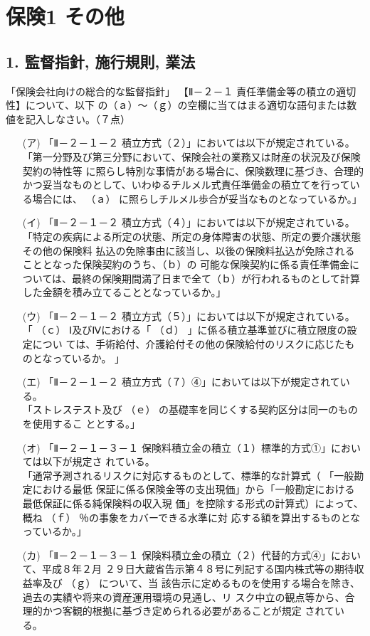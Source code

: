 \documentclass[report,gutter=10mm,fore-edge=10mm,uplatex,dvipdfmx]{jlreq}
\begin{document}
\chapter{保険1 その他}
\section{1. 監督指針, 施行規則, 業法}


「保険会社向けの総合的な監督指針」
【Ⅱ－２－１ 責任準備金等の積立の適切性】について、以下
の（ａ）～（ｇ）の空欄に当てはまる適切な語句または数値を記入しなさい。（７点）

\begin{itemize}
 \item [(ア)]「Ⅱ－２－１－２ 積立方式（２）」においては以下が規定されている。\\
「第一分野及び第三分野において、保険会社の業務又は財産の状況及び保険契約の特性等
に照らし特別な事情がある場合に、保険数理に基づき、合理的かつ妥当なものとして、いわゆるチルメル式責任準備金の積立てを行っている場合には、 （ａ） に照らしチルメル歩合が妥当なものとなっているか。」
 \item [(イ)]「Ⅱ－２－１－２ 積立方式（４）」においては以下が規定されている。\\
「特定の疾病による所定の状態、所定の身体障害の状態、所定の要介護状態その他の保険料
払込の免除事由に該当し、以後の保険料払込が免除されることとなった保険契約のうち、（ｂ）の
可能な保険契約に係る責任準備金については、最終の保険期間満了日まで全て（ｂ）が行われるものとして計算した金額を積み立てることとなっているか。」
\item[(ウ)]「Ⅱ－２－１－２ 積立方式（５）」においては以下が規定されている。\\
「 （ｃ） Ⅰ及びⅣにおける「 （ｄ） 」に係る積立基準並びに積立限度の設定につい
ては、手術給付、介護給付その他の保険給付のリスクに応じたものとなっているか。
」
\item[(エ)]「Ⅱ－２－１－２ 積立方式（７）④」においては以下が規定されている。\\
「ストレステスト及び （ｅ） の基礎率を同じくする契約区分は同一のものを使用するこ
ととする。」
\item[(オ)]「Ⅱ－２－１－３－１ 保険料積立金の積立（１）標準的方式①」においては以下が規定さ
れている。\\
「通常予測されるリスクに対応するものとして、標準的な計算式（
「一般勘定における最低
保証に係る保険金等の支出現価」から「一般勘定における最低保証に係る純保険料の収入現
価」を控除する形式の計算式）によって、概ね （ｆ） ％の事象をカバーできる水準に対
応する額を算出するものとなっているか。」
\item[(カ)]「Ⅱ－２－１－３－１ 保険料積立金の積立（２）代替的方式④」において、平成８年２月
２９日大蔵省告示第４８号に列記する国内株式等の期待収益率及び （ｇ） について、当
該告示に定めるものを使用する場合を除き、過去の実績や将来の資産運用環境の見通し、リ
スク中立の観点等から、合理的かつ客観的根拠に基づき定められる必要があることが規定
されている。
\end{itemize}
\end{document}

